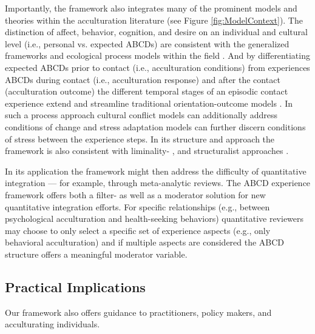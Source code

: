 \documentclass[man, 12pt, a4paper, mask]{apa7}
\begin{document}
Importantly, the framework also integrates many of the prominent models and theories within the acculturation literature (see Figure \ref{fig:ModelContext}). The distinction of affect, behavior, cognition, and desire on an individual and cultural level (i.e., personal vs. expected ABCDs) are consistent with the generalized frameworks \citep[e.g.,][]{Berry2005, Cross1991} and ecological process models within the field \citep[e.g.,][]{Ward2016, Serdarevic2005, Mistry2010}. And by differentiating expected ABCDs prior to contact (i.e., acculturation conditions) from experiences ABCDs during contact (i.e., acculturation response) and after the contact (acculturation outcome) the different temporal stages of an episodic contact experience extend and streamline traditional orientation-outcome models \citep[e.g.,][]{Arends-Toth2006a, TeLindert2008a}. In such a process approach cultural conflict models can additionally address conditions of change \citep[e.g.,][]{Robinson2019} and stress adaptation models can further discern conditions of stress \citep[e.g.,][]{Kim1988, Hajro2019, Sam2006b} between the experience steps. In its structure and approach the framework is also consistent with liminality- \citep[e.g.,][]{Loon2021, Baird2015}, and structuralist approaches \citep[e.g.,][]{Kemppainen2020}.

In its application the framework might then address the difficulty of quantitative integration --- for example, through meta-analytic reviews. The ABCD experience framework offers both a filter- as well as a moderator solution for new quantitative integration efforts. For specific relationships (e.g., between psychological acculturation and health-seeking behaviors) quantitative reviewers may choose to only select a specific set of experience aspects (e.g., only behavioral acculturation) and if multiple aspects are considered the ABCD structure offers a meaningful moderator variable. 

\subsection{Practical Implications}
Our framework also offers guidance to practitioners, policy makers, and acculturating individuals. 

\end{document}
